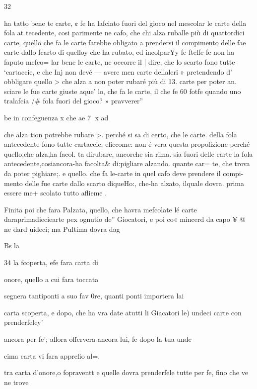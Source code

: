 \documentclass[12pt,a6paper]{article}
\begin{document}
 

 

 

 

32

ha tatto bene te carte, ¢ fe ha
lafciato fuori del gioco nel mescolar le carte della fola at
tecedente, cosi parimente ne
cafo, che chi alza ruballe più di
quattordici carte, quello che fa
le carte farebbe obligato a
prendersi il compimento delle
fae carte dallo fcarto di quelloy che ha rubato, ed incolparYy
fe ftelfe fe non ha faputo mefco=
lar bene le carte, ne occorre il |
dire, che lo scarto fono tutte
‘cartaccie, e che Inj non devé —
avere men carte dellaleri » pretendendo d’ obbligare quello >
che alza a non poter rubaré
più di 13. carte per poter an.
sciare le fue carte giuste aque’
lo, che fa le carte, il che fe 60%
fotfe quando uno tralafcia /#
fola fuori del gioco? » pravverer”

be in confeguenza x che ae 7
x ad

che alza tion potrebbe rubare >.
perché si sa di certo, che le
carte. della fola antecedente
fono tutte cartaccie, eficcome:
non é vera questa propofizione
perché quello,che alza,ha facol.
ta dirubare, ancorche sia rima.
sia fuori delle carte la fola antecedente,cosiancora-ha facolta&
di:pigliare alzando. quante car=
te, che trova da poter pighiare;.
e quello. che fa le-carte in quel
cafo deve prendere il compi-mento delle fue carte dallo scarto diqueHo:, che-ha alzato, ilquale dovra. prima essere me+
scolato tutto aflieme .

Finita poi che fara Palzata,
quello, che havra mefcolate lé
carte daraprimadieciearte pex
ognutio de” Giocatori, e poi co«
mincerd da capo ¥ @ ne dard
uideci; ma Pultima dovra dag

Bs la

 
 

34
la fcoperta, efe fara carta di

onore, quello a cui fara toccata

segnera tantiponti a suo fav 0re, quanti ponti importera lai

carta scoperta, e dopo, che ha
vra date atutti li Giacatori le)
undeci carte con prenderfeley’

ancora per fe’; allora offervera
ancora lui, fe dopo la tua unde

cima carta vi fara apprefio al=.

tra carta d’onore,o fopraventt
e quelle dovra prenderfele tutte per fe, fino che ve ne trove
\end{document}
